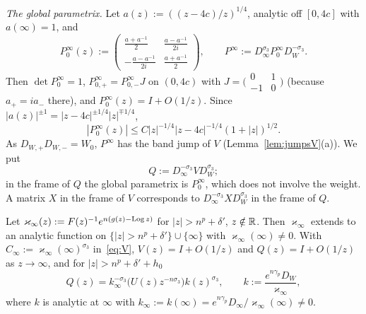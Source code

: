 \emph{The global parametrix.} Let $a(z):=((z-4c)/z)^{1/4}$, analytic off $[0,4c]$ with $a(\infty)=1$, and
\begin{equation}\label{eq:Pinf0}
  P^\infty_0(z):=\begin{pmatrix}\frac{a+a^{-1}}2&\frac{a-a^{-1}}{2i}\\[1mm]-\frac{a-a^{-1}}{2i}&\frac{a+a^{-1}}2\end{pmatrix},\qquad
  P^\infty:=D_\infty^{\sigma_3}P^\infty_0D_W^{-\sigma_3}.
\end{equation}
Then $\det P^\infty_0=1$, $P^\infty_{0,+}=P^\infty_{0,-}J$ on $(0,4c)$ with $J=\bigl(\begin{smallmatrix}0&1\\-1&0\end{smallmatrix}\bigr)$
(because $a_+=ia_-$ there), and $P^\infty_0(z)=I+O(1/z)$. Since $|a(z)|^{\pm1}=|z-4c|^{\pm1/4}|z|^{\mp1/4}$,
\begin{equation}\label{eq:Pinf0-bound}
  |P^\infty_0(z)|\le C|z|^{-1/4}|z-4c|^{-1/4}(1+|z|)^{1/2}.
\end{equation}
As $D_{W,+}D_{W,-}=W_0$, $P^\infty$ has the band jump of $V$ (Lemma~\ref{lem:jumpsV}(a)). We put
\begin{equation}\label{eq:Q}
  Q:=D_\infty^{-\sigma_3}VD_W^{\sigma_3};
\end{equation}
in the frame of $Q$ the global parametrix is $P^\infty_0$, which does not involve the weight. A matrix $X$ in the frame
of $V$ corresponds to $D_\infty^{-\sigma_3}XD_W^{\sigma_3}$ in the frame of $Q$.

\begin{lemma}\label{lem:normalisation}
Let $\varkappa_\infty(z):=F(z)^{-1}e^{n(g(z)-\operatorname{Log} z)}$ for $|z|>n^p+\delta'$, $z\notin\mathbb{R}$. Then $\varkappa_\infty$ extends to
an analytic function on $\{|z|>n^p+\delta'\}\cup\{\infty\}$ with $\varkappa_\infty(\infty)\ne0$. With
$C_\infty:=\varkappa_\infty(\infty)^{\sigma_3}$ in~\eqref{eq:V}, $V(z)=I+O(1/z)$ and $Q(z)=I+O(1/z)$ as $z\to\infty$, and
for $|z|>n^p+\delta'+h_0$
\begin{equation}\label{eq:Q-at-infinity}
  Q(z)=k_\infty^{-\sigma_3}\bigl(U(z)z^{-n\sigma_3}\bigr)k(z)^{\sigma_3},\qquad k:=\frac{e^{n\gamma_p}D_W}{\varkappa_\infty},
\end{equation}
where $k$ is analytic at $\infty$ with $k_\infty:=k(\infty)=e^{n\gamma_p}D_\infty/\varkappa_\infty(\infty)\ne0$.
\end{lemma}

